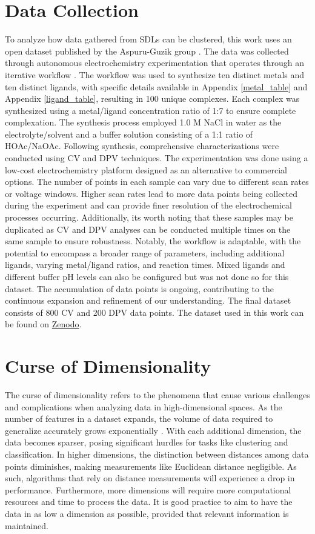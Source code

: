 \section{Data Collection}
To analyze how data gathered from SDLs can be clustered, this work uses an open dataset published by the Aspuru-Guzik group \cite{PabloGarca2024}. The data was collected through autonomous electrochemistry experimentation that operates through an iterative workflow \cite{PabloGarca2024}. The workflow was used to synthesize ten distinct metals and ten distinct ligands, with specific details available in Appendix \ref{metal_table} and Appendix \ref{ligand_table}, resulting in 100 unique complexes. Each complex was synthesized using a metal/ligand concentration ratio of 1:7 to ensure complete complexation. The synthesis process employed 1.0 M NaCl in water as the electrolyte/solvent and a buffer solution consisting of a 1:1 ratio of HOAc/NaOAc. Following synthesis, comprehensive characterizations were conducted using CV and DPV techniques. The experimentation was done using a low-cost electrochemistry platform designed as an alternative to commercial options. The number of points in each sample can vary due to different scan rates or voltage windows. Higher scan rates lead to more data points being collected during the experiment and can provide finer resolution of the electrochemical processes occurring. Additionally, it\textquotesingle s worth noting that these samples may be duplicated as CV and DPV analyses can be conducted multiple times on the same sample to ensure robustness. Notably, the workflow is adaptable, with the potential to encompass a broader range of parameters, including additional ligands, varying metal/ligand ratios, and reaction times. Mixed ligands and different buffer pH levels can also be configured but was not done so for this dataset. The accumulation of data points is ongoing, contributing to the continuous expansion and refinement of our understanding. The final dataset consists of 800 CV and 200 DPV data points. The dataset used in this work can be found on \href{https://zenodo.org/doi/10.5281/zenodo.10633135}{Zenodo}.
\section{Curse of Dimensionality}
The curse of dimensionality refers to the phenomena that cause various challenges and complications when analyzing data in high-dimensional spaces. As the number of features in a dataset expands, the volume of data required to generalize accurately grows exponentially \cite{Bellman2003-by}. With each additional dimension, the data becomes sparser, posing significant hurdles for tasks like clustering and classification. In higher dimensions, the distinction between distances among data points diminishes, making measurements like Euclidean distance negligible. As such, algorithms that rely on distance measurements will experience a drop in performance. Furthermore, more dimensions will require more computational resources and time to process the data. It is good practice to aim to have the data in as low a dimension as possible, provided that relevant information is maintained. 
